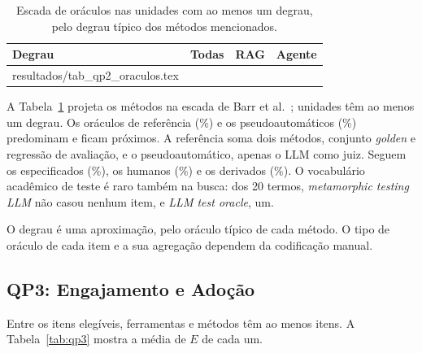 \documentclass[sigconf]{acmart}
\makeatletter
\newcommand{\linhas}[1]{\@@input resultados/#1.tex }
\makeatother
\begin{document}
\begin{table}[htbp]
\centering
\caption{Escada de oráculos nas unidades com ao menos um degrau, pelo degrau típico dos métodos mencionados.}
\label{tab:oraculos}
\footnotesize
\begin{tabular}{@{}lrrr@{}}
\toprule
\textbf{Degrau} & \textbf{Todas} & \textbf{RAG} & \textbf{Agente} \\
\midrule
\linhas{tab_qp2_oraculos}
\bottomrule
\end{tabular}
\par\vspace{2pt}{\footnotesize As colunas somam mais de 100\%: uma unidade pode combinar degraus.\par}
\end{table}

A Tabela~\ref{tab:oraculos} projeta os métodos na escada de Barr et al.~\cite{barr2015oracle}; \ResUnidadesComOraculo{} unidades têm ao menos um degrau. Os oráculos de referência (\ResPctReferencia\%) e os pseudoautomáticos (\ResPctPseudo\%) predominam e ficam próximos. A referência soma dois métodos, conjunto \textit{golden} e regressão de avaliação, e o pseudoautomático, apenas o LLM como juiz. Seguem os especificados (\ResPctEspecificado\%), os humanos (\ResPctHumano\%) e os derivados (\ResPctDerivado\%). %
O vocabulário acadêmico de teste é raro também na busca: dos 20 termos, \textit{metamorphic testing LLM} não casou nenhum item, e \textit{LLM test oracle}, um.

O degrau é uma aproximação, pelo oráculo típico de cada método. O tipo de oráculo de cada item e a sua agregação dependem da codificação manual.

\subsection{QP3: Engajamento e Adoção}
\label{sec:res-qp3}

Entre os \ResEngItens{} itens elegíveis, \ResEngFerramentas{} ferramentas e \ResEngMetodos{} métodos têm ao menos \ResMinN{} itens. A Tabela~\ref{tab:qp3} mostra a média de $E$ de cada um.
\end{document}
